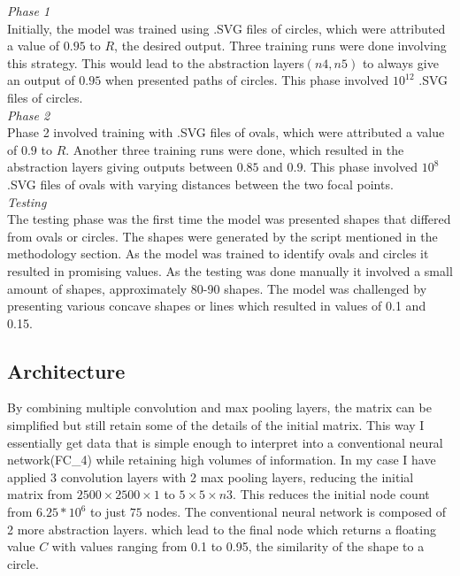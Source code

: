 \documentclass[9pt,onecolumn,oneside]{osajnl}
\begin{document}
\emph{Phase 1}\\

	Initially, the model was trained using .SVG files of circles, which were attributed a value of \(0.95\) to \(R\), the desired output. Three training runs were done involving this strategy. This would lead to the abstraction layers\((n4, n5)\) to always give an output of \(0.95\) when presented paths of circles. This phase involved \(10^{12}\) .SVG files of circles.\\

\emph{Phase 2}\\

	Phase 2 involved training with .SVG files of ovals, which were attributed a value of \(0.9\) to \(R\). Another three training runs were done, which resulted in the abstraction layers giving outputs between \(0.85\) and \(0.9\). This phase involved \(10^{8}\) .SVG files of ovals with varying distances between the two focal points.\\

\emph{Testing}\\

	The testing phase was the first time the model was presented shapes that differed from ovals or circles. The shapes were generated by the script mentioned in the methodology section. As the model was trained to identify ovals and circles it resulted in promising values. As the testing was done manually it involved a small amount of shapes, approximately 80-90 shapes. The model was challenged by presenting various concave shapes or lines which resulted in values of 0.1 and 0.15. \\
    
    
    
\subsection{Architecture}


	By combining multiple convolution and max pooling layers, the matrix can be simplified but still retain some of the details of the initial matrix. This way I essentially get data that is simple enough to interpret into a conventional neural network(FC_4) while retaining high volumes of information. In my case I have applied 3 convolution layers with 2 max pooling layers, reducing the initial matrix from \(2500 \times 2500 \times 1\) to \(5 \times 5 \times n3\). This reduces the initial node count from \(6.25*10^{6}\) to just \(75\) nodes. The conventional neural network is composed of 2 more abstraction layers. which lead to the final node which returns a floating value \(C\) with values ranging from 0.1 to 0.95, the similarity of the shape to a circle.
        
\end{document}
